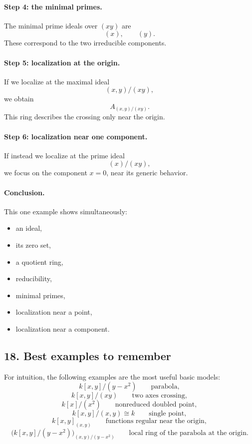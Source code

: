 \documentclass[12pt,a4paper]{article}
\theoremstyle{plain}
\theoremstyle{definition}      %
\begin{document}
	\paragraph{Step 4: the minimal primes.}
	The minimal prime ideals over \((xy)\) are
	\[
	(x), \qquad (y).
	\]
	These correspond to the two irreducible components.
	
	\paragraph{Step 5: localization at the origin.}
	If we localize at the maximal ideal
	\[
	(x,y)/(xy),
	\]
	we obtain
	\[
	A_{(x,y)/(xy)}.
	\]
	This ring describes the crossing only near the origin.
	
	\paragraph{Step 6: localization near one component.}
	If instead we localize at the prime ideal
	\[
	(x)/(xy),
	\]
	we focus on the component \(x=0\), near its generic behavior.
	
	\paragraph{Conclusion.}
	This one example shows simultaneously:
	\begin{itemize}
		\item an ideal,
		\item its zero set,
		\item a quotient ring,
		\item reducibility,
		\item minimal primes,
		\item localization near a point,
		\item localization near a component.
	\end{itemize}
	
	\subsection*{18. Best examples to remember}
	
	For intuition, the following examples are the most useful basic models:
	\[
	k[x,y]/(y-x^2)
	\qquad \text{parabola},
	\]
	\[
	k[x,y]/(xy)
	\qquad \text{two axes crossing},
	\]
	\[
	k[x]/(x^2)
	\qquad \text{nonreduced doubled point},
	\]
	\[
	k[x,y]/(x,y)\cong k
	\qquad \text{single point},
	\]
	\[
	k[x,y]_{(x,y)}
	\qquad \text{functions regular near the origin},
	\]
	\[
	\bigl(k[x,y]/(y-x^2)\bigr)_{(x,y)/(y-x^2)}
	\qquad \text{local ring of the parabola at the origin}.
	\]
	
\end{document}
